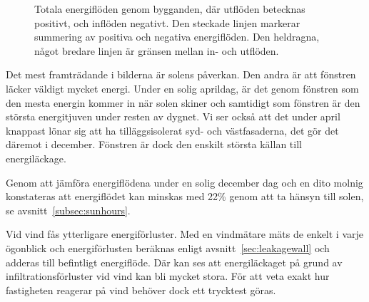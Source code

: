 \begin{figure}[hpbt]
\centering
{}


\caption{\label{fig:energyflow_sum} Totala energiflöden genom bygganden, där utflöden
 betecknas positivt, och inflöden negativt. Den steckade linjen markerar summering av 
 positiva och negativa energiflöden. Den heldragna, något bredare linjen är gränsen mellan in- och utflöden.}
\end{figure}

Det mest framträdande i bilderna är solens påverkan. Den andra är att fönstren läcker väldigt 
mycket energi. Under en solig aprildag, är det genom fönstren som den mesta energin 
kommer in när solen skiner och samtidigt som fönstren är den största energitjuven under 
resten av dygnet. Vi ser också att det under april knappast lönar sig att ha tilläggsisolerat syd-
 och västfasaderna, det gör det däremot i december. Fönstren är dock den enskilt största 
 källan till energiläckage.

Genom att jämföra energiflödena under en solig december dag och en dito molnig konstateras att energiflödet kan minskas med 22\% genom att ta hänsyn till solen, se avsnitt~\ref{subsec:sunhours}.

Vid vind fås ytterligare energiförluster. Med en vindmätare mäts de enkelt i varje ögonblick och 
energiförlusten beräknas enligt avsnitt~\ref{sec:leakagewall} och adderas till befintligt energiflöde. Där kan ses att energiläckaget på grund av infiltrationsförluster vid vind kan bli mycket stora. För att veta exakt hur fastigheten reagerar på vind behöver dock ett trycktest göras.